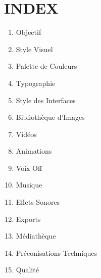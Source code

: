 \documentclass[12pt,a4paper,oneside]{book}
\begin{document}
\appendix

\chapter{INDEX}
\begin{enumerate}
\item Objectif
\item Style Visuel
\item Palette de Couleurs
\item Typographie
\item Style des Interfaces
\item Bibliothèque d'Images
\item Vidéos
\item Animations
\item Voix Off
\item Musique
\item Effets Sonores
\item Exports
\item Médiathèque
\item Préconisations Techniques
\item Qualité
\end{enumerate}
\end{document}
